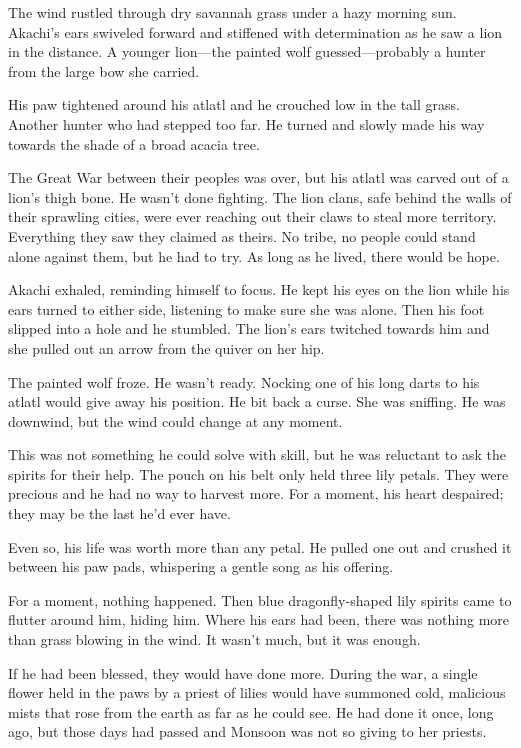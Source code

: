 The wind rustled through dry savannah grass under a hazy morning sun. Akachi's ears swiveled forward and stiffened with determination as he saw a lion in the distance. A younger lion---the painted wolf guessed---probably a hunter from the large bow she carried.

His paw tightened around his atlatl and he crouched low in the tall grass. Another hunter who had stepped too far. He turned and slowly made his way towards the shade of a broad acacia tree.

The Great War between their peoples was over, but his atlatl was carved out of a lion's thigh bone. He wasn't done fighting. The lion clans, safe behind the walls of their sprawling cities, were ever reaching out their claws to steal more territory. Everything they saw they claimed as theirs. No tribe, no people could stand alone against them, but he had to try. As long as he lived, there would be hope.

Akachi exhaled, reminding himself to focus. He kept his eyes on the lion while his ears turned to either side, listening to make sure she was alone. Then his foot slipped into a hole and he stumbled. The lion's ears twitched towards him and she pulled out an arrow from the quiver on her hip.

The painted wolf froze. He wasn't ready. Nocking one of his long darts to his atlatl would give away his position. He bit back a curse. She was sniffing. He was downwind, but the wind could change at any moment.

This was not something he could solve with skill, but he was reluctant to ask the spirits for their help. The pouch on his belt only held three lily petals. They were precious and he had no way to harvest more. For a moment, his heart despaired; they may be the last he'd ever have.

Even so, his life was worth more than any petal. He pulled one out and crushed it between his paw pads, whispering a gentle song as his offering.

For a moment, nothing happened. Then blue dragonfly-shaped lily spirits came to flutter around him, hiding him. Where his ears had been, there was nothing more than grass blowing in the wind. It wasn't much, but it was enough.

If he had been blessed, they would have done more. During the war, a single flower held in the paws by a priest of lilies would have summoned cold, malicious mists that rose from the earth as far as he could see. He had done it once, long ago, but those days had passed and Monsoon was not so giving to her priests.

